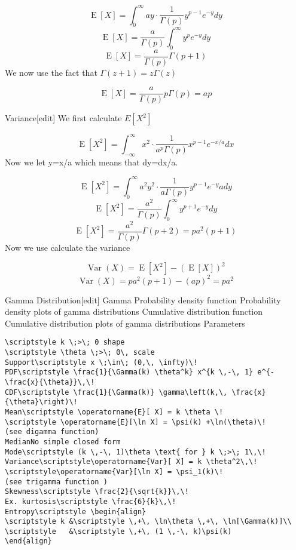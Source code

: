 \documentclass[]{report}
\begin{document}
\[\operatorname{E}[X]=\int^\infty_{0}ay \cdot \frac{1}{\Gamma (p)} y^{p-1} e^{-y}dy\]
$$\operatorname{E}[X]=\frac{a}{\Gamma (p)}\int^\infty_{0}y^{p} e^{-y}dy$$
$$\operatorname{E}[X]=\frac{a}{\Gamma (p)}\Gamma (p+1)$$
We now use the fact that $\Gamma (z+1)=z\Gamma (z)$

\[\operatorname{E}[X]=\frac{a}{\Gamma (p)}p\Gamma (p)=ap\]

Variance[edit]
We first calculate $E[X^2]$

$$\operatorname{E}[X^2]=\int^\infty_{-\infty}x^2 \cdot \frac{1}{a^p \Gamma (p)} x^{p-1} e^{-x/a}dx$$
Now we let y=x/a which means that dy=dx/a.

$$\operatorname{E}[X^2]=\int^\infty_0 a^2 y^2 \cdot \frac{1}{a \Gamma (p)} y^{p-1} e^{-y}ady$$
$$\operatorname{E}[X^2]=\frac{a^2}{ \Gamma (p)}\int^\infty_0  y^{p+1} e^{-y}dy$$
$$\operatorname{E}[X^2]=\frac{a^2}{ \Gamma (p)}\Gamma (p+2) =pa^2(p+1)$$
Now we use calculate the variance

$$\operatorname{Var}(X)=\operatorname{E}[X^2]-(\operatorname{E}[X])^2$$
$$\operatorname{Var}(X)=pa^2(p+1)-(ap)^2=pa^2$$


Gamma Distribution[edit]
Gamma
Probability density function
Probability density plots of gamma distributions
Cumulative distribution function
Cumulative distribution plots of gamma distributions
Parameters

\begin{verbatim}
\scriptstyle k \;>\; 0 shape
\scriptstyle \theta \;>\; 0\, scale
Support\scriptstyle x \;\in\; (0,\, \infty)\!
PDF\scriptstyle \frac{1}{\Gamma(k) \theta^k} x^{k \,-\, 1} e^{-\frac{x}{\theta}}\,\!
CDF\scriptstyle \frac{1}{\Gamma(k)} \gamma\left(k,\, \frac{x}{\theta}\right)\!
Mean\scriptstyle \operatorname{E}[ X] = k \theta \!
\scriptstyle \operatorname{E}[\ln X] = \psi(k) +\ln(\theta)\!
(see digamma function)
MedianNo simple closed form
Mode\scriptstyle (k \,-\, 1)\theta \text{ for } k \;>\; 1\,\!
Variance\scriptstyle\operatorname{Var}[ X] = k \theta^2\,\!
\scriptstyle\operatorname{Var}[\ln X] = \psi_1(k)\!
(see trigamma function )
Skewness\scriptstyle \frac{2}{\sqrt{k}}\,\!
Ex. kurtosis\scriptstyle \frac{6}{k}\,\!
Entropy\scriptstyle \begin{align}
\scriptstyle k &\scriptstyle \,+\, \ln\theta \,+\, \ln[\Gamma(k)]\\
\scriptstyle   &\scriptstyle \,+\, (1 \,-\, k)\psi(k)
\end{align}
\end{verbatim}
\end{document}
